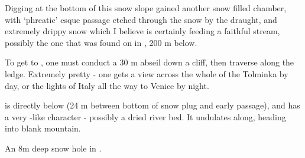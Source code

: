 Digging at the bottom of this snow slope gained another snow filled chamber, with `phreatic' esque passage etched through the snow by the draught, and extremely drippy snow which I believe is certainly feeding a faithful stream, possibly the one that was found on  in , 200 m below. 

To get to , one must conduct a 30
m abseil down a cliff, then traverse along the ledge. Extremely pretty - one gets a view across the whole of the Tolminka by day, or the lights of Italy all the way to Venice by night.

 is directly below  (24 m between bottom of snow
plug and early passage), and has a very -like character -
possibly a dried river bed. It undulates along, heading into blank
mountain.

\begin{marginfigure}
\caption{An 8m deep snow hole in . }
\end{marginfigure}


